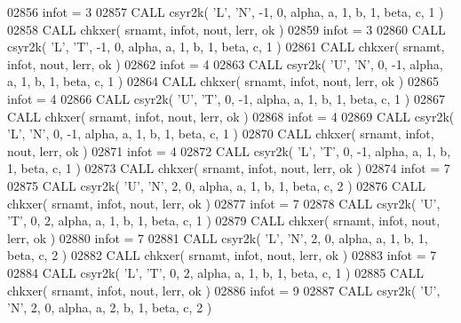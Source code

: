 \begin{DoxyCode}
02856       infot = 3
02857       \textcolor{keyword}{CALL }csyr2k( \textcolor{stringliteral}{'L'}, \textcolor{stringliteral}{'N'}, -1, 0, alpha, a, 1, b, 1, beta, c, 1 )
02858       \textcolor{keyword}{CALL }chkxer( srnamt, infot, nout, lerr, ok )
02859       infot = 3
02860       \textcolor{keyword}{CALL }csyr2k( \textcolor{stringliteral}{'L'}, \textcolor{stringliteral}{'T'}, -1, 0, alpha, a, 1, b, 1, beta, c, 1 )
02861       \textcolor{keyword}{CALL }chkxer( srnamt, infot, nout, lerr, ok )
02862       infot = 4
02863       \textcolor{keyword}{CALL }csyr2k( \textcolor{stringliteral}{'U'}, \textcolor{stringliteral}{'N'}, 0, -1, alpha, a, 1, b, 1, beta, c, 1 )
02864       \textcolor{keyword}{CALL }chkxer( srnamt, infot, nout, lerr, ok )
02865       infot = 4
02866       \textcolor{keyword}{CALL }csyr2k( \textcolor{stringliteral}{'U'}, \textcolor{stringliteral}{'T'}, 0, -1, alpha, a, 1, b, 1, beta, c, 1 )
02867       \textcolor{keyword}{CALL }chkxer( srnamt, infot, nout, lerr, ok )
02868       infot = 4
02869       \textcolor{keyword}{CALL }csyr2k( \textcolor{stringliteral}{'L'}, \textcolor{stringliteral}{'N'}, 0, -1, alpha, a, 1, b, 1, beta, c, 1 )
02870       \textcolor{keyword}{CALL }chkxer( srnamt, infot, nout, lerr, ok )
02871       infot = 4
02872       \textcolor{keyword}{CALL }csyr2k( \textcolor{stringliteral}{'L'}, \textcolor{stringliteral}{'T'}, 0, -1, alpha, a, 1, b, 1, beta, c, 1 )
02873       \textcolor{keyword}{CALL }chkxer( srnamt, infot, nout, lerr, ok )
02874       infot = 7
02875       \textcolor{keyword}{CALL }csyr2k( \textcolor{stringliteral}{'U'}, \textcolor{stringliteral}{'N'}, 2, 0, alpha, a, 1, b, 1, beta, c, 2 )
02876       \textcolor{keyword}{CALL }chkxer( srnamt, infot, nout, lerr, ok )
02877       infot = 7
02878       \textcolor{keyword}{CALL }csyr2k( \textcolor{stringliteral}{'U'}, \textcolor{stringliteral}{'T'}, 0, 2, alpha, a, 1, b, 1, beta, c, 1 )
02879       \textcolor{keyword}{CALL }chkxer( srnamt, infot, nout, lerr, ok )
02880       infot = 7
02881       \textcolor{keyword}{CALL }csyr2k( \textcolor{stringliteral}{'L'}, \textcolor{stringliteral}{'N'}, 2, 0, alpha, a, 1, b, 1, beta, c, 2 )
02882       \textcolor{keyword}{CALL }chkxer( srnamt, infot, nout, lerr, ok )
02883       infot = 7
02884       \textcolor{keyword}{CALL }csyr2k( \textcolor{stringliteral}{'L'}, \textcolor{stringliteral}{'T'}, 0, 2, alpha, a, 1, b, 1, beta, c, 1 )
02885       \textcolor{keyword}{CALL }chkxer( srnamt, infot, nout, lerr, ok )
02886       infot = 9
02887       \textcolor{keyword}{CALL }csyr2k( \textcolor{stringliteral}{'U'}, \textcolor{stringliteral}{'N'}, 2, 0, alpha, a, 2, b, 1, beta, c, 2 )

\end{DoxyCode}
